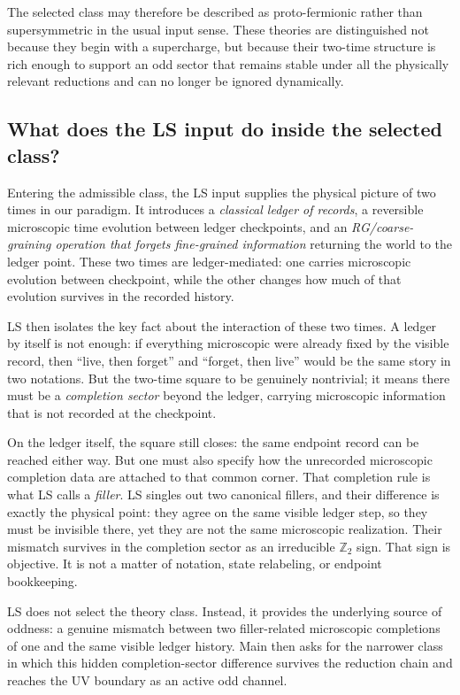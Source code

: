 \documentclass[
  aps,
  prd,
  onecolumn,
  notitlepage,
  nofootinbib,
  superscriptaddress,
  10pt
]{revtex4-2}
\theoremstyle{definition}
\theoremstyle{plain}
\begin{document}
The selected class may therefore be described as proto-fermionic rather than
supersymmetric in the usual input sense.  These theories are distinguished not
because they begin with a supercharge, but because their two-time structure is
rich enough to support an odd sector that remains stable under all the
physically relevant reductions and can no longer be ignored dynamically.

\subsection{What does the LS input do inside the selected class?}

Entering the admissible class, the LS input supplies the physical picture of two times in our paradigm.  It introduces a \emph{classical ledger of
records}, a reversible microscopic time evolution between ledger checkpoints,
and an \emph{RG/coarse-graining operation that forgets fine-grained information} returning the world to the ledger point.  These two times are
ledger-mediated: one carries microscopic evolution between checkpoint, while the other changes how much of that evolution survives in the
recorded history.

LS then isolates the key fact about the interaction of these two times.  A
ledger by itself is not enough: if everything microscopic were already fixed by
the visible record, then ``live, then forget'' and ``forget, then live'' would
be the same story in two notations.  But the two-time square to be genuinely
nontrivial; it means there must be a \emph{completion sector} beyond the ledger, carrying
microscopic information that is not recorded at the checkpoint.

On the ledger itself, the square still closes: the same endpoint record can be
reached either way.  But one must also specify how the unrecorded microscopic
completion data are attached to that common corner.  That completion rule is
what LS calls a \emph{filler}.  LS singles out two canonical fillers, and their
difference is exactly the physical point: they agree on the same visible ledger
step, so they must be invisible there, yet they are not the same microscopic
realization.  Their mismatch survives in the completion sector as an
irreducible \(\mathbb Z_2\) sign.  That sign is objective.  It is not a matter
of notation, state relabeling, or endpoint bookkeeping.

LS does not select the theory class. Instead, it provides the underlying source of oddness: a genuine mismatch
between two filler-related microscopic completions of one and the same visible
ledger history.  Main then asks for the narrower class in which this hidden
completion-sector difference survives the reduction chain and reaches the UV
boundary as an active odd channel.
\end{document}
